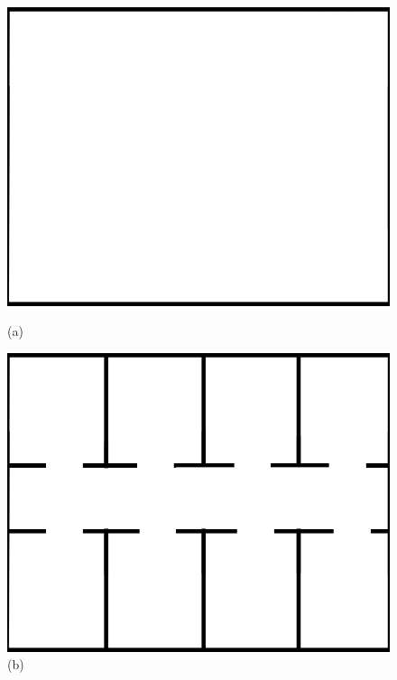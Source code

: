 \documentclass[letterpaper, 10 pt, conference]{ieeeconf}  %
\begin{document}
\begin{figure}[H]
	\centering
	\begin{minipage}{0.3\columnwidth}
		\centering
		\includegraphics[width=\columnwidth]{free-space.png}
		\caption{(a)}
		\label{fig:free}
	\end{minipage}
	\begin{minipage}{0.3\columnwidth}
		\centering
		\includegraphics[width=\columnwidth]{office.png}
		\caption{(b)}
		\label{fig:office}
	\end{minipage}
	\begin{minipage}{0.3\columnwidth}
		\centering

\end{minipage}
\end{figure}
\end{document}
